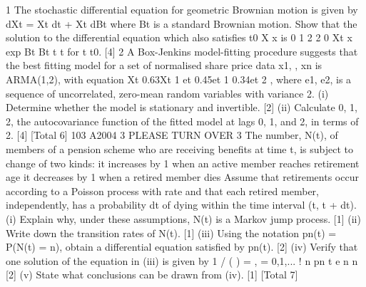 
1 The stochastic differential equation for geometric Brownian motion is given by
dXt = Xt dt + Xt dBt
where Bt is a standard Brownian motion. Show that the solution to the differential
equation which also satisfies
t0 X x is
0
1 2
2 0 Xt x exp Bt Bt t t
for t t0. [4]
2 A Box-Jenkins model-fitting procedure suggests that the best fitting model for a set of
normalised share price data x1, , xn is ARMA(1,2), with equation
Xt 0.63Xt 1 et 0.45et 1 0.34et 2 ,
where {e1, e2, } is a sequence of uncorrelated, zero-mean random variables with
variance 2.
(i) Determine whether the model is stationary and invertible. [2]
(ii) Calculate 0, 1, 2, the autocovariance function of the fitted model at lags 0, 1,
and 2, in terms of 2. [4]
[Total 6]
103 A2004 3 PLEASE TURN OVER
3 The number, N(t), of members of a pension scheme who are receiving benefits at time
t, is subject to change of two kinds:
it increases by 1 when an active member reaches retirement age
it decreases by 1 when a retired member dies
Assume that retirements occur according to a Poisson process with rate and that
each retired member, independently, has a probability dt of dying within the time
interval (t, t + dt).
(i) Explain why, under these assumptions, N(t) is a Markov jump process. [1]
(ii) Write down the transition rates of N(t). [1]
(iii) Using the notation pn(t) = P(N(t) = n), obtain a differential equation satisfied
by pn(t). [2]
(iv) Verify that one solution of the equation in (iii) is given by
1 /
( ) = , = 0,1,...
!
n
pn t e n
n
[2]
(v) State what conclusions can be drawn from (iv). [1]
[Total 7]

